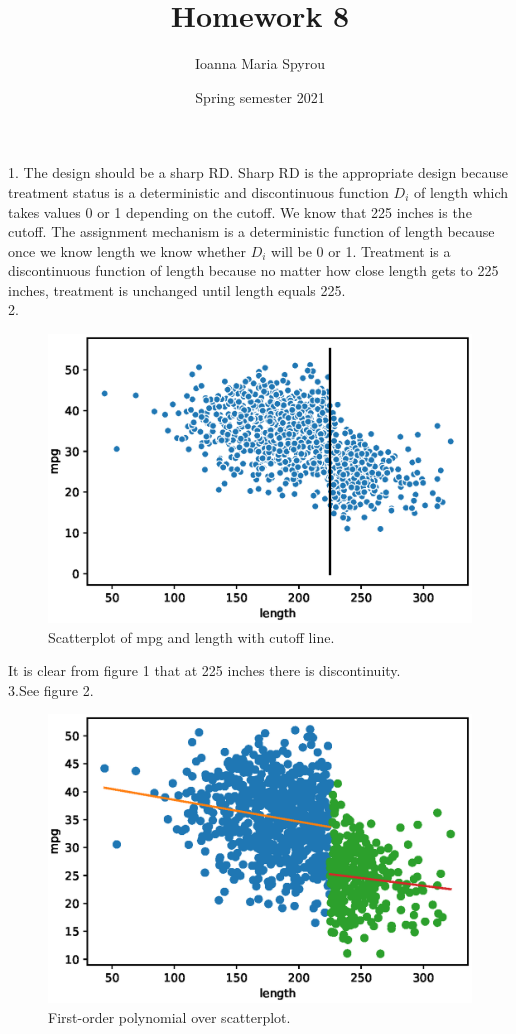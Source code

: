 \documentclass{article}
\title{Homework 8}
\author{Ioanna Maria Spyrou}
\date{Spring semester 2021}
\begin{document}
  
\maketitle


1. The design should be a sharp RD. Sharp RD is the appropriate design because treatment status is a deterministic and discontinuous function $D_i$ of length which takes values 0 or 1 depending on the cutoff. We know that 225 inches is the cutoff. The assignment mechanism is a deterministic function of length because once we know length we know whether $D_i$ will be 0 or 1. Treatment is a discontinuous function of length because no matter how close length gets to 225 inches, treatment is unchanged until length equals 225.  \\

2. 
\begin{figure}[H]
\centering
\includegraphics[scale = 0.7]{figure1.eps}
\caption{Scatterplot of mpg and length with cutoff line.}
\end{figure}

It is clear from figure 1 that at 225 inches there is discontinuity.\\

3.See figure 2.
\begin{figure}[H]
\centering
\includegraphics[scale = 0.7]{figure2.eps}
\caption{First-order polynomial over scatterplot.}
\end{figure} 
\end{document}
